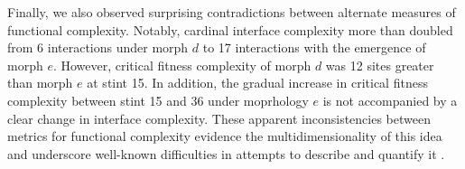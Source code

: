 Finally, we also observed surprising contradictions between alternate measures of functional complexity.
Notably, cardinal interface complexity more than doubled from 6 interactions under morph $d$ to 17 interactions with the emergence of morph $e$.
However, critical fitness complexity of morph $d$ was 12 sites greater than morph $e$ at stint 15.
In addition, the gradual increase in critical fitness complexity between stint 15 and 36 under moprhology $e$ is not accompanied by a clear change in interface complexity.
These apparent inconsistencies between metrics for functional complexity evidence the multidimensionality of this idea and underscore well-known difficulties in attempts to describe and quantify it \citep{bottcher2018molecules}.